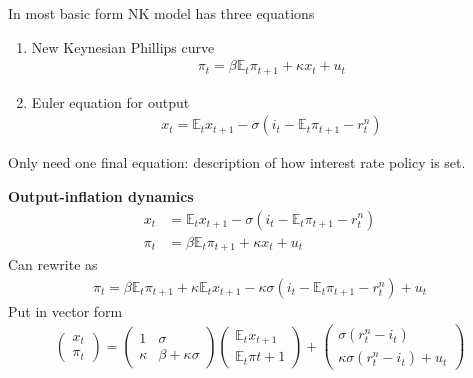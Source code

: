 \documentclass{beamer}
\begin{document}
\begin{frame}
  In most basic form NK model has three equations
\begin{enumerate}
  \item New Keynesian Phillips curve
  \begin{align} \pi_t=\beta \mathbb{E}_t \pi_{t+1} + \kappa x_t + u_t \end{align}
  \item Euler equation for output
  \begin{align} x_t = \mathbb{E}_t x_{t+1} - \sigma (i_t - \mathbb{E}_t \pi_{t+1} - r_t^n) \end{align}
\end{enumerate}
 \medskip
 Only need one final equation: description of how interest rate policy is set.
\end{frame}

\begin{frame}
  \textbf{Output-inflation dynamics}
\begin{align}
  x_t &=\mathbb{E}_tx_{t+1} - \sigma(i_t-\mathbb{E}_t\pi_{t+1} - r_t^n)\\
  \pi_t &= \beta \mathbb{E}_t \pi_{t+1} + \kappa x_t + u_t
\end{align}
\medskip
Can rewrite as  
\begin{align}
  \pi_t = \beta \mathbb{E}_t \pi_{t+1} + \kappa \mathbb{E}_t x_{t+1} - \kappa\sigma(i_t - \mathbb{E}_t \pi_{t+1} - r_t^n) + u_t
\end{align}
 Put in vector form
\begin{align}
  \begin{pmatrix} x_t \\ \pi_t \end{pmatrix} = \begin{pmatrix} 1 & \sigma \\ \kappa & \beta +\kappa\sigma \end{pmatrix}
  \begin{pmatrix} \mathbb{E}_tx_{t+1} \\ \mathbb{E}_t \pi{t+1} \end{pmatrix} + 
  \begin{pmatrix} \sigma (r_t^n-i_t) \\ \kappa\sigma (r_t^n-i_t) + u_t \end{pmatrix}
\end{align}  
\end{frame}
\end{document}
